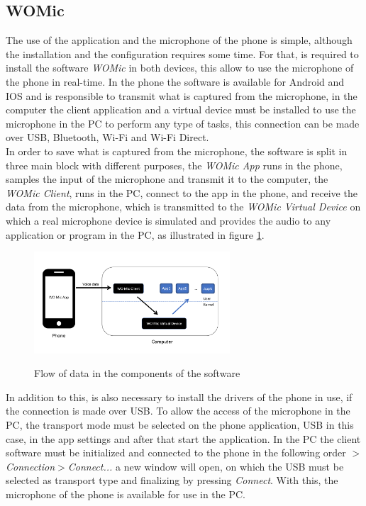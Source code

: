 \subsection*{WOMic}
The use of the application and the microphone of the phone is simple, although the installation and the configuration requires some time. For that, is required to install the software \textit{WOMic} in both devices, this allow to use the microphone of the phone in real-time. In the phone the software is available for Android and IOS and is responsible to transmit what is captured from the microphone, in the computer the client application and a virtual device must be installed to use the microphone in the PC to perform any type of tasks, this connection can be made over USB, Bluetooth, Wi-Fi and Wi-Fi Direct.\\ 
In order to save what is captured from the microphone, the software is split in three main block with different purposes, the \textit{WOMic App} runs in the phone, samples the input of the microphone and transmit it to the computer, the \textit{WOMic Client}, runs in the PC, connect to the app in the phone, and receive the data from the microphone, which is transmitted to the \textit{WOMic Virtual Device} on which a real microphone device is simulated and provides the audio to any application or program in the PC, as illustrated in figure \ref{fig:diagramWOMIC}.\\
\begin{figure}[!htb]
    \centering
    \includegraphics[width=0.65\textwidth]{Chapters/5CHP/Images/WOMICDiag.png}
    \caption{Flow of data in the components of the software}{\cite{WOMicFREE}}
    \label{fig:diagramWOMIC}
\end{figure}
In addition to this, is also necessary to install the drivers of the phone in use, if the connection is made over USB. To allow the access of the microphone in the PC, the transport mode must be selected on the phone application, USB in this case, in the app settings and after that start the application. In the PC the client software must be initialized and connected to the phone in the following order \textit{$>$Connection$>$Connect...} a new window will open, on which the USB must be selected as transport type and finalizing by pressing \textit{Connect}. With this, the microphone of the phone is available for use in the PC\cite{WOMicFREE}.
